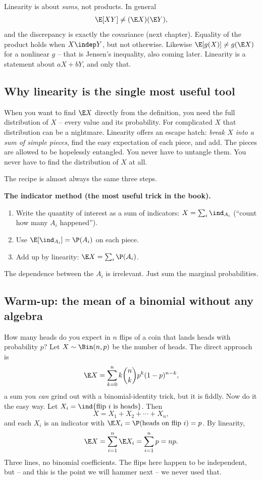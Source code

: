 \begin{trapbox}
Linearity is about \emph{sums}, not products. In general
\[
  \E[XY] \ne (\E X)(\E Y),
\]
and the discrepancy is exactly the covariance (next chapter). Equality of the
product holds when $X \indep Y$, but not otherwise. Likewise $\E[g(X)] \ne
g(\E X)$ for a nonlinear $g$ -- that is Jensen's inequality, also coming later.
Linearity is a statement about $aX+bY$, and only that.
\end{trapbox}

\subsection{Why linearity is the single most useful tool}

When you want to find $\E X$ directly from the definition, you need the full
distribution of $X$ -- every value and its probability. For complicated $X$ that
distribution can be a nightmare. Linearity offers an escape hatch: \emph{break
$X$ into a sum of simple pieces}, find the easy expectation of each piece, and
add. The pieces are allowed to be hopelessly entangled. You never have to
untangle them. You never have to find the distribution of $X$ at all.

The recipe is almost always the same three steps.

\begin{focusbox}
\textbf{The indicator method (the most useful trick in the book).}
\begin{enumerate}
  \item Write the quantity of interest as a sum of indicators:
        $X = \sum_i \ind_{A_i}$ (``count how many $A_i$ happened'').
  \item Use $\E[\ind_{A_i}] = \P(A_i)$ on each piece.
  \item Add up by linearity: $\E X = \sum_i \P(A_i)$.
\end{enumerate}
The dependence between the $A_i$ is irrelevant. Just sum the marginal
probabilities.
\end{focusbox}

\subsection{Warm-up: the mean of a binomial without any algebra}

How many heads do you expect in $n$ flips of a coin that lands heads with
probability $p$? Let $X \sim \Bin(n,p)$ be the number of heads. The direct
approach is
\[
  \E X = \sum_{k=0}^n k\binom{n}{k}p^k(1-p)^{n-k},
\]
a sum you \emph{can} grind out with a binomial-identity trick, but it is fiddly.
Now do it the easy way. Let $X_i = \ind\{\text{flip } i \text{ is heads}\}$. Then
\[
  X = X_1 + X_2 + \cdots + X_n,
\]
and each $X_i$ is an indicator with $\E X_i = \P(\text{heads on flip } i) = p$.
By linearity,
\[
  \E X = \sum_{i=1}^n \E X_i = \sum_{i=1}^n p = np.
\]
Three lines, no binomial coefficients. The flips here happen to be independent,
but -- and this is the point we will hammer next -- we never used that.

